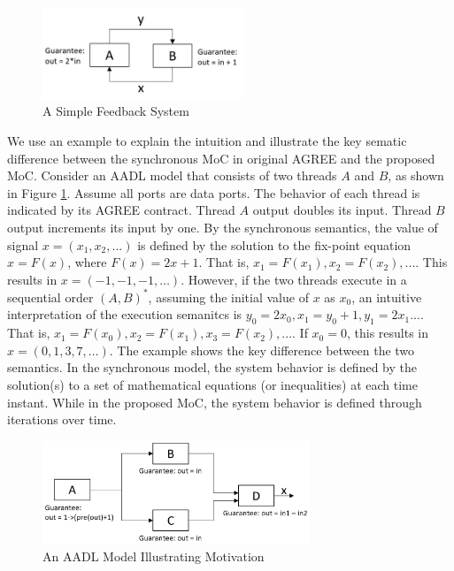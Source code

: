 \begin{figure}[ht!]
\centering
\includegraphics[width=60mm]{simpleFeedback.jpg}
\caption{A Simple Feedback System\label{motivationFig1}}
\end{figure}

We use an example to explain the intuition and illustrate the key sematic difference between the synchronous MoC in original AGREE and the proposed MoC.
Consider an AADL model that consists of two threads $A$ and $B$, as shown in Figure \ref{motivationFig1}. Assume all ports are data ports. The behavior of each thread is indicated by its AGREE contract. Thread $A$ output doubles its input. Thread $B$ output increments its input by one. By the synchronous semantics, the value of signal $x = (x_1, x_2, ...)$ is defined by the solution to the fix-point equation $x = F(x)$, where $F(x) = 2x + 1$. That is, $x_1 = F(x_1), x_2 = F(x_2),...$. This results in $x = (-1, -1, -1,…)$. However, if the two threads execute in a sequential order $(A,B)^*$, assuming the initial value of $x$ as $x_0$, an intuitive interpretation of the execution semanitcs is $y_0 = 2x_0, x_1 = y_0+1, y_1 = 2x_1...$. That is, $x_1 = F(x_0), x_2 = F(x_1), x_3 = F(x_2),...$. If $x_0 = 0$, this results in $x = (0, 1, 3, 7,…)$. The example shows the key difference between the two semantics. In the synchronous model, the system behavior is defined by the solution(s) to a set of mathematical equations (or inequalities) at each time instant. While in the proposed MoC, the system behavior is defined through iterations over time.

\begin{figure}[ht!]
\centering
\includegraphics[width=80mm]{motivationalexample1.jpg}
\caption{An AADL Model Illustrating Motivation\label{motivationFig2}}
\end{figure}

